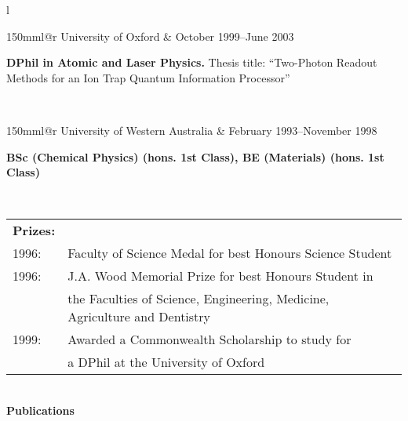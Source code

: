 \documentclass[10pt,a4paper]{article}
\makeatletter
\newcommand{\role}[6]{
\begin{tabular*}{150mm}{l@{\extracolsep{\fill}}r}
#5 & #1--#2 \\ 
\multicolumn{2}{p{140mm}}
{\textbf{#3}#4

#6} 
\end{tabular*}
\vspace{0.8mm}
 }
\makeatother
\begin{document}
\begin{tabular}{l}
  \role{October 1999}{June 2003} 
     {DPhil in Atomic and Laser Physics.}{ Thesis title: 
     ``Two-Photon Readout Methods for an Ion Trap Quantum Information
     Processor''}
     {University of Oxford}{} \\
  \role{February 1993}{November 1998}
      {BSc (Chemical Physics) (hons. 1st Class),
       BE (Materials) (hons. 1st Class)}{}
      {University of Western Australia}{}
    \\
    \begin{tabular*}{140mm}{ll}
      \textbf{Prizes:}\\
        1996: & Faculty of Science Medal for best Honours Science
        Student\\
        1996: & J.A. Wood Memorial Prize for best Honours Student in\\
        & the Faculties of Science, Engineering, Medicine, Agriculture
        and Dentistry\\
         1999: & Awarded a Commonwealth Scholarship to study for\\
         & a DPhil at the University of Oxford
    \end{tabular*}

\end{tabular} \\
%
{\large \textbf{Publications}}
\end{document}
